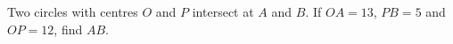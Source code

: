 Two circles with centres $O$ and $P$ intersect at $A$ and $B$. If $OA=13$, $PB=5$ and $OP=12$, find $AB$.
